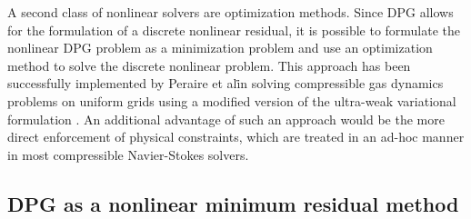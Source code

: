 A second class of nonlinear solvers are optimization methods.  Since DPG allows for the formulation of a discrete nonlinear residual, it is possible to formulate the nonlinear DPG problem as a minimization problem and use an optimization method to solve the discrete nonlinear problem.  This approach has been successfully implemented by Peraire et al\. in solving compressible gas dynamics problems on uniform grids using a modified version of the ultra-weak variational formulation \cite{MITDPG}.  An additional advantage of such an approach would be the more direct enforcement of physical constraints, which are treated in an ad-hoc manner in most compressible Navier-Stokes solvers.  

\subsection{DPG as a nonlinear minimum residual method}


